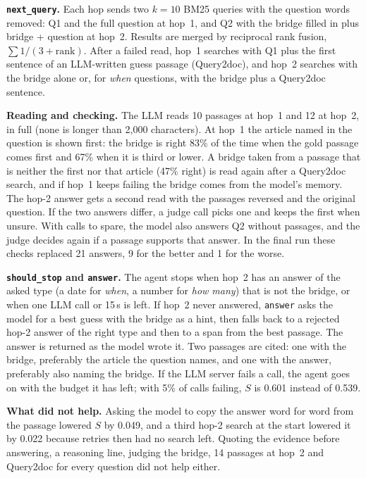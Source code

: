 \documentclass[10pt,a4paper]{article}
\begin{document}
\textbf{\texttt{next\_query}.} Each hop sends two $k{=}10$ BM25 queries with the question words removed: Q1 and
the full question at hop~1, and Q2 with the bridge filled in plus bridge + question at hop~2. Results are merged by
reciprocal rank fusion, $\sum 1/(3+\mathrm{rank})$. After a failed read, hop~1 searches with Q1 plus the first
sentence of an LLM-written guess passage (Query2doc), and hop~2 searches with the bridge alone or, for \emph{when}
questions, with the bridge plus a Query2doc sentence.

\textbf{Reading and checking.} The LLM reads 10 passages at hop~1 and 12 at hop~2, in full (none is longer than
2,000 characters). At hop~1 the article named in the question is shown first: the bridge is right 83\% of the time
when the gold passage comes first and 67\% when it is third or lower. A bridge taken from a passage that is neither the
first nor that article (47\% right) is read again after a Query2doc search, and if hop~1 keeps failing the bridge comes from the model's memory.
The hop-2 answer gets a second read with the passages reversed and the original question. If the two answers
differ, a judge call picks one and keeps the first when unsure. With calls to spare, the model also answers Q2
without passages, and the judge decides again if a passage supports that answer. In the final run these checks
replaced 21 answers, 9 for the better and 1 for the worse.

\textbf{\texttt{should\_stop} and \texttt{answer}.} The agent stops when hop~2 has an answer of the asked type
(a date for \emph{when}, a number for \emph{how many}) that is not the bridge, or when one LLM call or 15\,s is
left. If hop~2 never answered, \texttt{answer} asks the model for a best guess with the bridge as a hint, then
falls back to a rejected hop-2 answer of the right type and then to a span from the best passage. The answer is
returned as the model wrote it. Two passages are cited: one with the bridge, preferably the article the question
names, and one with the answer, preferably also naming the bridge. If the LLM server fails a call, the agent goes
on with the budget it has left; with 5\% of calls failing, $S$ is 0.601 instead of 0.539.

\textbf{What did not help.} Asking the model to copy the answer word for word from the passage lowered $S$ by
0.049, and a third hop-2 search at the start lowered it by 0.022 because retries then had no search left. Quoting
the evidence before answering, a reasoning line, judging the bridge, 14 passages at hop~2 and Query2doc for every
question did not help either.
\end{document}
